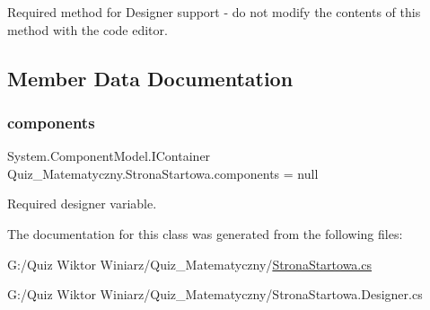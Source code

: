 Required method for Designer support -\/ do not modify the contents of this method with the code editor. 



\subsection{Member Data Documentation}
\mbox{\label{class_quiz___matematyczny_1_1_strona_startowa_ad43f87d86fc5620cb8e6bf37550472aa}} 
\subsubsection{\texorpdfstring{components}{components}}
{\footnotesize\ttfamily System.\+Component\+Model.\+I\+Container Quiz\+\_\+\+Matematyczny.\+Strona\+Startowa.\+components = null\hspace{0.3cm}{\ttfamily [private]}}



Required designer variable. 



The documentation for this class was generated from the following files\+:\begin{DoxyCompactItemize}
\item 
G\+:/\+Quiz Wiktor Winiarz/\+Quiz\+\_\+\+Matematyczny/\mbox{\hyperlink{_strona_startowa_8cs}{Strona\+Startowa.\+cs}}\item 
G\+:/\+Quiz Wiktor Winiarz/\+Quiz\+\_\+\+Matematyczny/Strona\+Startowa.\+Designer.\+cs\end{DoxyCompactItemize}

